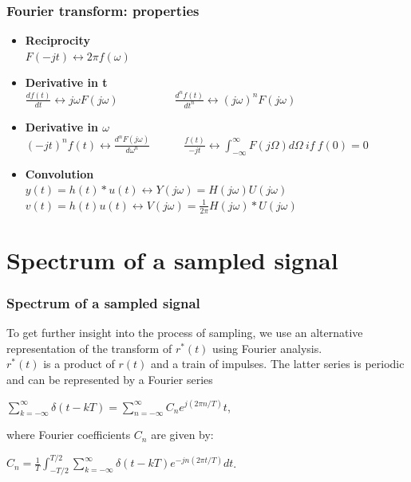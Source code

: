 \begin{frame}
	\frametitle{Fourier transform: properties}
	\begin{itemize}
		\item \textbf{Reciprocity} \\
		\medskip
		$F(-jt) \leftrightarrow  2 \pi f(\omega)$
		\medskip
		\item \textbf{Derivative in t} \\
		\medskip
		$\frac{df(t)}{dt} \leftrightarrow j\omega F(j\omega) \qquad \qquad \quad \frac{d^nf(t)}{dt^n} \leftrightarrow (j\omega)^n F(j\omega)$
		\medskip
		\item \textbf{Derivative in $\omega$} \\
		\medskip
		$(-jt)^n f(t) \leftrightarrow \frac{d^n F(j\omega)}{d\omega^n} \qquad \quad \frac{f(t)}{-jt} \leftrightarrow \int_{-\infty}^\infty F(j\Omega) d\Omega \> if \> f(0) = 0$
		\medskip
		\item \textbf{Convolution} \\
		\medskip
		$y(t) = h(t) * u(t) \leftrightarrow Y(j\omega) = H(j\omega) U(j\omega)$\\
		$v(t) = h(t)u(t) \leftrightarrow V(j\omega) = \frac{1}{2\pi} H(j\omega)*U(j\omega)$
	\end{itemize}
\end{frame}

\section{Spectrum of a sampled signal}

\begin{frame}
	\frametitle{Spectrum of a sampled signal}
	\vspace{-5ex}
	To get further insight into the process of sampling, we use an alternative representation of the transform of $r^*(t)$ using Fourier analysis.\\
	\medskip
	$r^*(t)$ is a product of $r(t)$ and a train of impulses. The latter series is periodic and can be represented by a Fourier series\\
	\begin{center}
		$\sum_{k=-\infty}^{\infty} \delta(t-kT) = \sum_{n=-\infty}^{\infty} C_ne^{j(2\pi n/T)}t$,
	\end{center}
	where Fourier coefficients $C_n$ are given by:\\
	\begin{center}
		$C_n=\frac{1}{T}\int_{-T/2}^{T/2} \sum_{k=-\infty}^{\infty} \delta(t-kT)e^{-jn(2\pi t/T)}dt$.
	\end{center}
	
\end{frame}

